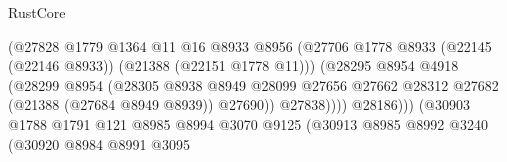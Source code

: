 \begin{lexlean}{RustCore}
\begin{coremodule}
                                                  (@27828
                                                    @1779
                                                    @1364
                                                    @11
                                                    @16
                                                    @8933
                                                    @8956
                                                    (@27706
                                                      @1778
                                                      @8933
                                                      (@22145 (@22146 @8933))
                                                      (@21388 (@22151 @1778 @11)))
                                                    (@28295
                                                      @8954
                                                      @4918
                                                      (@28299
                                                        @8954
                                                        (@28305
                                                          @8938
                                                          @8949
                                                          @28099
                                                          @27656
                                                          @27662
                                                          @28312
                                                          @27682
                                                          (@21388 (@27684 @8949 @8939))
                                                          @27690))
                                                      @27838))))
                                              @28186)))
                                        (@30903
                                          @1788
                                          @1791
                                          @121
                                          @8985
                                          @8994
                                          @3070
                                          @9125
                                          (@30913
                                            @8985
                                            @8992
                                            @3240
                                            (@30920
                                              @8984
                                              @8991
                                              @3095

\end{coremodule}
\end{lexlean}
